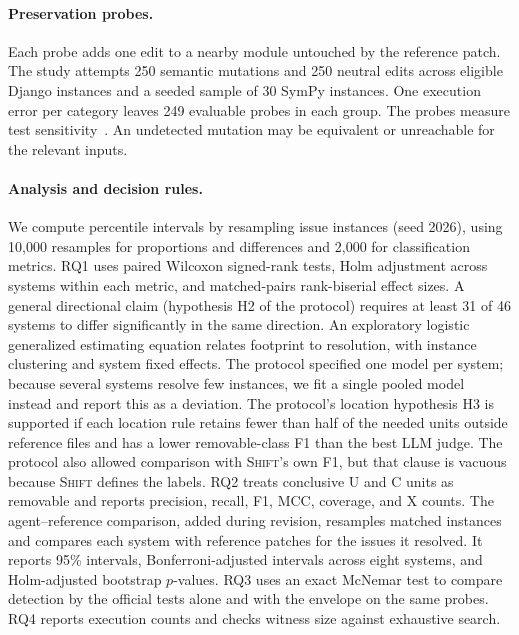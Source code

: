 \documentclass[a4paper,fleqn]{cas-sc}
\newcommand{\tool}{\textsc{Shift}}
\newcommand{\lab}[1]{\textsf{#1}}
\begin{document}
\paragraph{Preservation probes.} Each probe adds one edit to a nearby module untouched by the reference patch. The study attempts 250 semantic mutations and 250 neutral edits across eligible Django instances and a seeded sample of 30 SymPy instances. One execution error per category leaves 249 evaluable probes in each group. The probes measure test sensitivity~\citep{jia2011mutation,just2014mutants}. An undetected mutation may be equivalent or unreachable for the relevant inputs.

\paragraph{Analysis and decision rules.} We compute percentile intervals by resampling issue instances (seed 2026), using 10,000 resamples for proportions and differences and 2,000 for classification metrics. RQ1 uses paired Wilcoxon signed-rank tests, Holm adjustment across systems within each metric, and matched-pairs rank-biserial effect sizes. A general directional claim (hypothesis H2 of the protocol) requires at least 31 of 46 systems to differ significantly in the same direction. An exploratory logistic generalized estimating equation relates footprint to resolution, with instance clustering and system fixed effects. The protocol specified one model per system; because several systems resolve few instances, we fit a single pooled model instead and report this as a deviation. The protocol's location hypothesis H3 is supported if each location rule retains fewer than half of the needed units outside reference files and has a lower removable-class F1 than the best LLM judge. The protocol also allowed comparison with \tool{}'s own F1, but that clause is vacuous because \tool{} defines the labels. RQ2 treats conclusive \lab{U} and \lab{C} units as removable and reports precision, recall, F1, MCC, coverage, and \lab{X} counts. The agent--reference comparison, added during revision, resamples matched instances and compares each system with reference patches for the issues it resolved. It reports 95\% intervals, Bonferroni-adjusted intervals across eight systems, and Holm-adjusted bootstrap $p$-values. RQ3 uses an exact McNemar test to compare detection by the official tests alone and with the envelope on the same probes. RQ4 reports execution counts and checks witness size against exhaustive search.
\end{document}
